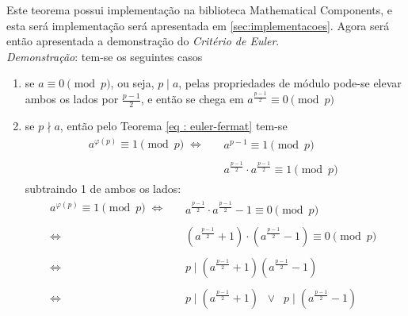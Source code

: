 Este teorema possui implementação na biblioteca Mathematical Components, e esta será implementação será apresentada em \ref{sec:implementacoes}. 
Agora será então apresentada a demonstração do \textit{Critério de Euler}.
\\
\noindent
\textit{Demonstração}: tem-se os seguintes casos
\begin{enumerate}
    \item se $a \equiv 0 \pmod p$, ou seja, $p \mid a$, pelas propriedades de módulo pode-se elevar ambos os lados por $\frac{p-1}{2}$, e
    então se chega em $a^{\frac{p-1}{2}} \equiv 0 \pmod p$

    \item se $p \nmid a$, então pelo Teorema \ref{eq : euler-fermat} tem-se 
\begin{align*}
        a^{\varphi(p)} \equiv 1  \pmod p \; \Longleftrightarrow
        &\begin{aligned}
            \;\; a^{p - 1} \equiv 1  \pmod p 
        \end{aligned} \\
        &\begin{aligned}
            \;\; a^{\frac{p-1}{2}} \cdot a^{\frac{p-1}{2}} \equiv 1  \pmod p 
        \end{aligned}
\end{align*}
subtraindo 1 de ambos os lados:
\begin{align*}
        a^{\varphi(p)} \equiv 1  \pmod p \; \Longleftrightarrow
        &\begin{aligned}
            \;\; a^{\frac{p-1}{2}} \cdot a^{\frac{p-1}{2}} -1 \equiv 0  \pmod p 
        \end{aligned} \\
        \Longleftrightarrow
        &\begin{aligned}
            \;\; (a^{\frac{p-1}{2}} + 1) \cdot (a^{\frac{p-1}{2}} - 1) \equiv 0  \pmod p 
        \end{aligned} \\
        \Longleftrightarrow
        &\begin{aligned}
            \;\; p \mid (a^{\frac{p-1}{2}} + 1) (a^{\frac{p-1}{2}} - 1)
        \end{aligned} \\
        \Longleftrightarrow
        &\begin{aligned}
            \;\; p \mid (a^{\frac{p-1}{2}} + 1) \;\; \lor \;\; p \mid (a^{\frac{p-1}{2}} - 1)
        \end{aligned} \\

\end{align*}
\end{enumerate}
